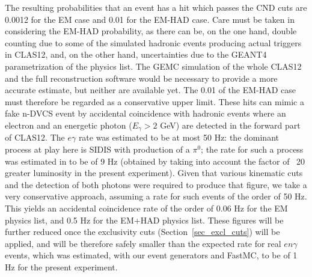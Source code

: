 The resulting probabilities that an event has a hit which passes the CND cuts are 0.0012 for the EM case and 0.01 for the EM-HAD case. Care must be taken in considering the EM-HAD probability, as there can be, on the one hand, double counting due to some of the simulated hadronic events producing actual triggers in CLAS12, and, on the other hand, uncertainties due to the GEANT4 parametrization of the physics list. The GEMC simulation of the whole CLAS12 and the full reconstruction software would be necessary to provide a more accurate estimate, but neither are available yet. The 0.01 of the EM-HAD case must therefore be regarded as a conservative upper limit. 
These hits can mimic a fake n-DVCS event by accidental coincidence with hadronic events where an electron and an energetic photon ($E_{\gamma}>2$ GeV) are detected in the forward part of CLAS12. The $e\gamma$ rate was estimated to be at most 50 Hz: the dominant process at play here is SIDIS with production of a $\pi^0$; the rate for such a process was estimated in \cite{sidis_prop} to be of 9 Hz (obtained by taking into account the factor of ~20 greater luminosity in the present experiment). Given that various kinematic cuts and the detection of both photons were required to produce that figure, we take a very conservative approach, assuming a rate for such events of the order of 50 Hz. This yields an accidental coincidence rate of the order of 0.06 Hz for the EM physics list, and 0.5 Hz for the EM+HAD physics list. These figures will be further reduced once the exclusivity cuts (Section~\ref{sec_excl_cuts}) will be applied, and will be therefore safely smaller than the expected rate for real $en\gamma$ events, which was estimated, with our event generators and FastMC, to be of 1 Hz for the present experiment. 

